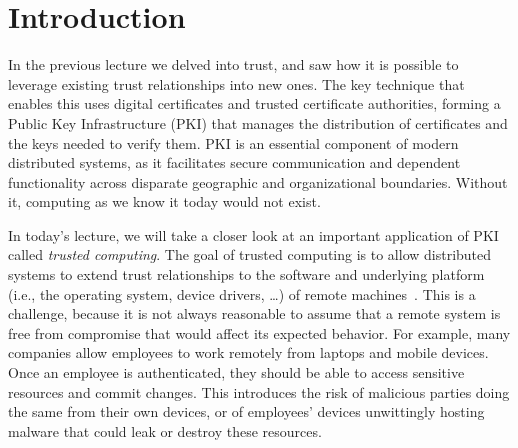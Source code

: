 \documentclass[11pt,twoside]{scrartcl}
\begin{document}

\lstset{escapechar=@,style=customc}

\maketitle
\thispagestyle{empty}


\section{Introduction}

In the previous lecture we delved into trust, and saw how it is possible to leverage existing trust relationships into new ones. The key technique that enables this uses digital certificates and trusted certificate authorities, forming a Public Key Infrastructure (PKI) that manages the distribution of certificates and the keys needed to verify them. PKI is an essential component of modern distributed systems, as it facilitates secure communication and dependent functionality across disparate geographic and organizational boundaries. Without it, computing as we know it today would not exist.

In today's lecture, we will take a closer look at an important application of PKI called \emph{trusted computing}. The goal of trusted computing is to allow distributed systems to extend trust relationships to the software and underlying platform (i.e., the operating system, device drivers, \ldots) of remote machines~\cite{Parno2011}. This is a challenge, because it is not always reasonable to assume that a remote system is free from compromise that would affect its expected behavior. For example, many companies allow employees to work remotely from laptops and mobile devices. Once an employee is authenticated, they should be able to access sensitive resources and commit changes. This introduces the risk of malicious parties doing the same from their own devices, or of employees' devices unwittingly hosting malware that could leak or destroy these resources. 
\end{document}

